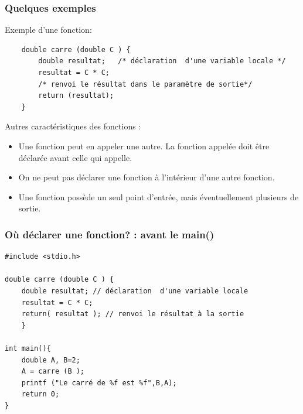 \documentclass{beamer}
\begin{document}
  
 
\begin{frame}[fragile]
\frametitle{Quelques exemples}
Exemple d'une fonction:
\begin{verbatim}
    double carre (double C ) {      
        double resultat;   /* déclaration  d'une variable locale */
        resultat = C * C;
        /* renvoi le résultat dans le paramètre de sortie*/
        return (resultat);
    }
\end{verbatim}
    Autres caractéristiques des fonctions :
\begin{itemize}
\item Une fonction peut en appeler une autre. La fonction appelée doit être déclarée avant celle qui appelle.
\item On ne peut pas déclarer une fonction à l'intérieur d'une autre fonction.
\item Une fonction possède un seul point d'entrée, mais éventuellement plusieurs de sortie. 
\end{itemize}

\end{frame}
  
  
 

\begin{frame}[fragile]
\frametitle{Où déclarer  une fonction? : avant le main()}
\begin{verbatim}
#include <stdio.h>

double carre (double C ) {      
    double resultat; // déclaration  d'une variable locale
    resultat = C * C;
    return( resultat ); // renvoi le résultat à la sortie
    }
    
int main(){
 	double A, B=2;
  	A = carre (B );
 	printf ("Le carré de %f est %f",B,A);
    return 0;
}
\end{verbatim}
\end{frame}
\end{document}

